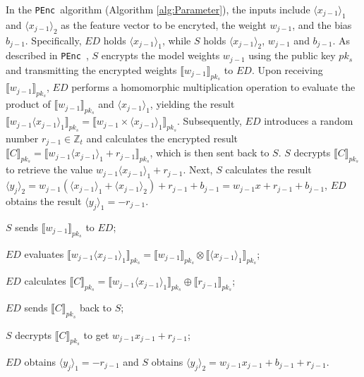 \documentclass[conference]{IEEEtran}
\newcommand{\PEnc}{\texttt{PEnc}}
\begin{document}
In the \PEnc~algorithm (Algorithm \ref{alg:Parameter}), the inputs include $\langle x_{j-1}\rangle_1$ and $\langle x_{j-1}\rangle_2$ as the feature vector to be encryted, the weight $w_{j-1}$, and the bias $b_{j-1}$. Specifically, $ED$ holds $\langle x_{j-1}\rangle_1$, while $S$ holds $\langle x_{j-1}\rangle_2$, $w_{j-1}$ and $b_{j-1}$. As described in \PEnc~, $S$ encrypts the model weights $w_{j-1}$ using the public key $pk_s$ and transmitting the encrypted weights $\llbracket w_{j-1} \rrbracket_{pk_s}$ to $ED$. Upon receiving $\llbracket w_{j-1} \rrbracket_{pk_s}$, $ED$ performs a homomorphic multiplication operation to evaluate the product of $\llbracket w_{j-1} \rrbracket_{pk_s}$ and $\langle x_{j-1} \rangle_1$, yielding the result $\llbracket w_{j-1} \langle x_{j-1} \rangle_1\rrbracket_{pk_s} = \llbracket w_{j-1} \times \langle x_{j-1} \rangle_1 \rrbracket_{pk_s}$. Subsequently, $ED$ introduces a random number $r_{j-1}\in \mathbb{Z}_t$ and calculates the encrypted result $\llbracket C \rrbracket_{pk_s}=\llbracket w_{j-1} \langle x_{j-1} \rangle_1 + r_{j-1} \rrbracket_{pk_s}$, which is then sent back to $S$. $S$ decrypts $\llbracket C \rrbracket_{pk_s}$ to retrieve the value $w_{j-1}\langle x_{j-1} \rangle_1+r_{j-1}$. Next, $S$ calculates the result $\langle y_j\rangle_2= w_{j-1}(\langle x_{j-1} \rangle_1 + \langle x_{j-1} \rangle_2)+r_{j-1}+b_{j-1}=w_{j-1}x+r_{j-1}+b_{j-1}$, $ED$ obtains the result $\langle y_j\rangle_1=-r_{j-1}$. 
\begin{algorithm}[htbp]
	\caption{\PEnc$(\langle x_{j-1} \rangle_1,\langle x_{j-1} \rangle_2,w_{j-1},b_{j-1}) \rightarrow (\langle y_j\rangle_1, \langle y_j\rangle_2)$}
    \label{alg:Parameter}
    \LinesNumbered
     $S$ sends $\llbracket w_{j-1}\rrbracket_{pk_s}$ to $ED$;
    
     $ED$ evaluates $\llbracket w_{j-1}\langle x_{j-1} \rangle_1 \rrbracket_{pk_s} = \llbracket w_{j-1} \rrbracket_{pk_s} \otimes \llbracket \langle x_{j-1} \rangle_1 \rrbracket_{pk_s}$;
    
     $ED$  calculates $\llbracket C\rrbracket_{pk_s} = \llbracket w_{j-1}\langle x_{j-1} \rangle_1 \rrbracket_{pk_s} \oplus \llbracket r_{j-1} \rrbracket_{pk_s}$;
     
     $ED$ sends $\llbracket C\rrbracket_{pk_s}$ back to $S$;
    
     $S$ decrypts $\llbracket C\rrbracket_{pk_s}$ to get $w_{j-1} x_{j-1} + r_{j-1}$;
     
     $ED$ obtains $\langle y_j\rangle_1=-r_{j-1}$ and $S$ obtains $\langle y_j\rangle_2 = w_{j-1} x_{{j-1}}  + b_{j-1} + r_{j-1}$.
\end{algorithm}
\end{document}
